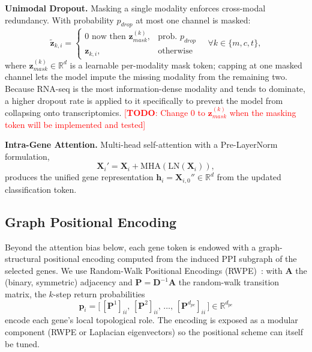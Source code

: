 \documentclass[10pt, twocolumn]{article}
\newcommand{\todo}[1]{\textcolor{red}{[\textbf{TODO}: #1]}}
\begin{document}
\vspace{0.15cm}\noindent\textbf{Unimodal Dropout.}
Masking a single modality enforces cross-modal redundancy. With probability
$p_{drop}$ at most one channel is masked:
\begin{equation}
    \tilde{\mathbf{z}}_{k,i} = \begin{cases}
      \text{0 now then }\mathbf{z}_{mask}^{(k)}, & \text{prob. } p_{drop} \\
      \mathbf{z}_{k,i}, & \text{otherwise}
   \end{cases} \quad \forall k \in \{m, c, t\},
\end{equation}
where $\mathbf{z}_{mask}^{(k)} \in \mathbb{R}^d$ is a learnable per-modality mask
token; capping at one masked channel lets the model impute the missing modality
from the remaining two. Because RNA-seq is the most information-dense modality and
tends to dominate, a higher dropout rate is applied to it specifically to prevent
the model from collapsing onto transcriptomics. \todo{Change 0 to
 $\mathbf{z}_{mask}^{(k)}$ when the masking token will be implemented and tested}

\vspace{0.15cm}\noindent\textbf{Intra-Gene Attention.}
Multi-head self-attention with a Pre-LayerNorm formulation,
\begin{equation}
    \mathbf{X}_i' = \mathbf{X}_i + \text{MHA}(\text{LN}(\mathbf{X}_i)),
\end{equation}
produces the unified gene representation $\mathbf{h}_i = \mathbf{X}_{i,0}'' \in
\mathbb{R}^d$ from the updated classification token.

\subsection{Graph Positional Encoding}
Beyond the attention bias below, each gene token is endowed with a graph-structural
positional encoding computed from the induced PPI subgraph of the selected genes.
We use Random-Walk Positional Encodings (RWPE)~\cite{dwivedi2022rwpe}: with
$\mathbf{A}$ the (binary, symmetric) adjacency and $\mathbf{P}=\mathbf{D}^{-1}
\mathbf{A}$ the random-walk transition matrix, the $k$-step return probabilities
\begin{equation}
    \mathbf{p}_i = \big[\, [\mathbf{P}^1]_{ii},\, [\mathbf{P}^2]_{ii},\, \dots,\,
    [\mathbf{P}^{d_{pe}}]_{ii} \,\big] \in \mathbb{R}^{d_{pe}}
\end{equation}
encode each gene's local topological role. The encoding is exposed as a modular
component (RWPE or Laplacian eigenvectors) so the positional scheme can itself be
tuned. 
\end{document}
